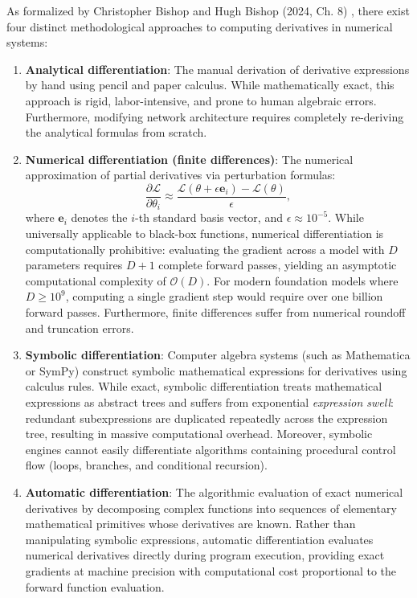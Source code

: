 \documentclass[../../main.tex]{subfiles}
\begin{document}
As formalized by Christopher Bishop and Hugh Bishop (2024, Ch. 8) \citep{bishop2024deep}, there exist four distinct methodological approaches to computing derivatives in numerical systems:
\begin{enumerate}[label=(\roman*)]
    \item \textbf{Analytical differentiation}: The manual derivation of derivative expressions by hand using pencil and paper calculus. While mathematically exact, this approach is rigid, labor-intensive, and prone to human algebraic errors. Furthermore, modifying network architecture requires completely re-deriving the analytical formulas from scratch.
    \item \textbf{Numerical differentiation (finite differences)}: The numerical approximation of partial derivatives via perturbation formulas:
    \begin{equation}
    \frac{\partial \mathcal{L}}{\partial \theta_i} \approx \frac{\mathcal{L}(\theta + \epsilon \mathbf{e}_i) - \mathcal{L}(\theta)}{\epsilon},
    \end{equation}
    where $\mathbf{e}_i$ denotes the $i$-th standard basis vector, and $\epsilon \approx 10^{-5}$. While universally applicable to black-box functions, numerical differentiation is computationally prohibitive: evaluating the gradient across a model with $D$ parameters requires $D + 1$ complete forward passes, yielding an asymptotic computational complexity of $\mathcal{O}(D)$. For modern foundation models where $D \ge 10^9$, computing a single gradient step would require over one billion forward passes. Furthermore, finite differences suffer from numerical roundoff and truncation errors.
    \item \textbf{Symbolic differentiation}: Computer algebra systems (such as Mathematica or SymPy) construct symbolic mathematical expressions for derivatives using calculus rules. While exact, symbolic differentiation treats mathematical expressions as abstract trees and suffers from exponential \textit{expression swell}: redundant subexpressions are duplicated repeatedly across the expression tree, resulting in massive computational overhead. Moreover, symbolic engines cannot easily differentiate algorithms containing procedural control flow (loops, branches, and conditional recursion).
    \item \textbf{Automatic differentiation}: The algorithmic evaluation of exact numerical derivatives by decomposing complex functions into sequences of elementary mathematical primitives whose derivatives are known. Rather than manipulating symbolic expressions, automatic differentiation evaluates numerical derivatives directly during program execution, providing exact gradients at machine precision with computational cost proportional to the forward function evaluation.
\end{enumerate}
\end{document}
